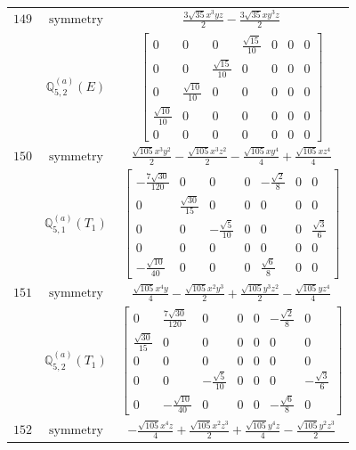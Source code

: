 \documentclass[fleqn,8pt,landscape]{jsarticle}
\begin{document}
\begin{longtable}{ccc}
$ 149 $ & $ \text{symmetry} $ & $ \frac{3 \sqrt{35} x^{3} y z}{2} - \frac{3 \sqrt{35} x y^{3} z}{2} $ \\
$  $ & $ \mathbb{Q}_{5,2}^{(a)}(E) $ & $ \begin{bmatrix} 0 & 0 & 0 & \frac{\sqrt{15}}{10} & 0 & 0 & 0 \\ 0 & 0 & \frac{\sqrt{15}}{10} & 0 & 0 & 0 & 0 \\ 0 & \frac{\sqrt{10}}{10} & 0 & 0 & 0 & 0 & 0 \\ \frac{\sqrt{10}}{10} & 0 & 0 & 0 & 0 & 0 & 0 \\ 0 & 0 & 0 & 0 & 0 & 0 & 0 \end{bmatrix} $ \\ \hline
$ 150 $ & $ \text{symmetry} $ & $ \frac{\sqrt{105} x^{3} y^{2}}{2} - \frac{\sqrt{105} x^{3} z^{2}}{2} - \frac{\sqrt{105} x y^{4}}{4} + \frac{\sqrt{105} x z^{4}}{4} $ \\
$  $ & $ \mathbb{Q}_{5,1}^{(a)}(T_{1}) $ & $ \begin{bmatrix} - \frac{7 \sqrt{30}}{120} & 0 & 0 & 0 & - \frac{\sqrt{2}}{8} & 0 & 0 \\ 0 & \frac{\sqrt{30}}{15} & 0 & 0 & 0 & 0 & 0 \\ 0 & 0 & - \frac{\sqrt{5}}{10} & 0 & 0 & 0 & \frac{\sqrt{3}}{6} \\ 0 & 0 & 0 & 0 & 0 & 0 & 0 \\ - \frac{\sqrt{10}}{40} & 0 & 0 & 0 & \frac{\sqrt{6}}{8} & 0 & 0 \end{bmatrix} $ \\ \hline
$ 151 $ & $ \text{symmetry} $ & $ \frac{\sqrt{105} x^{4} y}{4} - \frac{\sqrt{105} x^{2} y^{3}}{2} + \frac{\sqrt{105} y^{3} z^{2}}{2} - \frac{\sqrt{105} y z^{4}}{4} $ \\
$  $ & $ \mathbb{Q}_{5,2}^{(a)}(T_{1}) $ & $ \begin{bmatrix} 0 & \frac{7 \sqrt{30}}{120} & 0 & 0 & 0 & - \frac{\sqrt{2}}{8} & 0 \\ \frac{\sqrt{30}}{15} & 0 & 0 & 0 & 0 & 0 & 0 \\ 0 & 0 & 0 & 0 & 0 & 0 & 0 \\ 0 & 0 & - \frac{\sqrt{5}}{10} & 0 & 0 & 0 & - \frac{\sqrt{3}}{6} \\ 0 & - \frac{\sqrt{10}}{40} & 0 & 0 & 0 & - \frac{\sqrt{6}}{8} & 0 \end{bmatrix} $ \\ \hline
$ 152 $ & $ \text{symmetry} $ & $ - \frac{\sqrt{105} x^{4} z}{4} + \frac{\sqrt{105} x^{2} z^{3}}{2} + \frac{\sqrt{105} y^{4} z}{4} - \frac{\sqrt{105} y^{2} z^{3}}{2} $ \\

\end{longtable}
\end{document}

